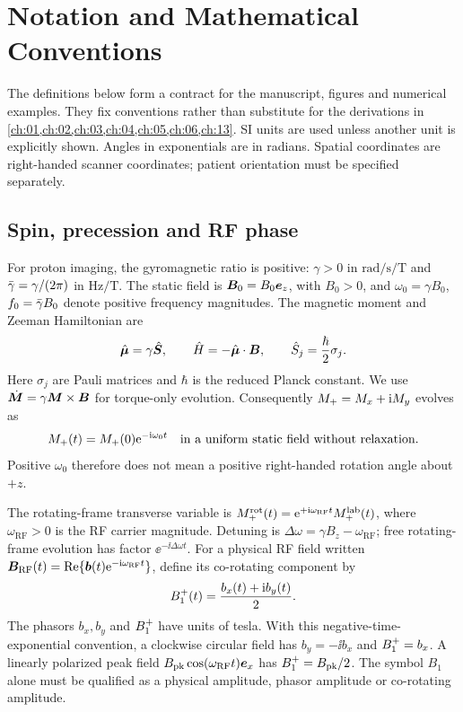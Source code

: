 \chapter{Notation and Mathematical Conventions}
\label{front:conventions}
The definitions below form a contract for the manuscript, figures and
numerical examples. They fix conventions rather than substitute for the
derivations in \cref{ch:01,ch:02,ch:03,ch:04,ch:05,ch:06,ch:13}.
SI units are used unless another unit is explicitly shown. Angles in
exponentials are in radians. Spatial coordinates are right-handed scanner
coordinates; patient orientation must be specified separately.

\section*{Spin, precession and RF phase}
For proton imaging, the gyromagnetic ratio is positive:
$\gamma>0$ in $\si{\radian\per\second\per\tesla}$ and
$\bar{\gamma}=\gamma/(2\pi)$ in $\si{\hertz\per\tesla}$.
The static field is $\bm{B}_0=B_0\bm{e}_z$, with $B_0>0$, and
$\omega_0=\gamma B_0$, $f_0=\bar{\gamma} B_0$ denote positive frequency
magnitudes. The magnetic moment and Zeeman Hamiltonian are
\begin{equation}
 \hat{\bm{\mu}}=\gamma\hat{\bm{S}},\qquad
 \hat{H}=-\hat{\bm{\mu}}\cdot\bm{B},\qquad
 \hat{S}_j=\frac{\hbar}{2}\sigma_j .
 \label{eq:convention:hamiltonian}
\end{equation}
Here $\sigma_j$ are Pauli matrices and $\hbar$ is the reduced Planck constant.
We use $\dot{\bm{M}}=\gamma\bm{M}\times\bm{B}$ for torque-only evolution.
Consequently $M_{+}=M_x+\mathrm{i} M_y$ evolves as
\begin{equation}
 M_{+}(t)=M_{+}(0)\mathrm{e}^{-\mathrm{i}\omega_0t}
 \quad\text{in a uniform static field without relaxation}.
 \label{eq:convention:precession}
\end{equation}
Positive $\omega_0$ therefore does not mean a positive right-handed
rotation angle about $+z$.

The rotating-frame transverse variable is
$M_{+}^{\mathrm{rot}}(t)=\mathrm{e}^{+\mathrm{i}\omega_{\mathrm{RF}}t}
M_{+}^{\mathrm{lab}}(t)$, where $\omega_{\mathrm{RF}}>0$ is the RF carrier
magnitude. Detuning is $\Delta\omega=\gamma B_z-\omega_{\mathrm{RF}}$;
free rotating-frame evolution has factor $\ee^{-\ii\Delta\omega t}$.
For a physical RF field written
$\bm{B}_{\mathrm{RF}}(t)=\operatorname{Re}\{
  \bm{b}(t)\mathrm{e}^{-\mathrm{i}\omega_{\mathrm{RF}}t}\}$,
define its co-rotating component by
\begin{equation}
 B_{1}^{+}(t)=\frac{b_x(t)+\mathrm{i} b_y(t)}{2}.
 \label{eq:convention:b1plus}
\end{equation}
The phasors $b_x,b_y$ and $B_{1}^{+}$ have units of tesla. With this
negative-time-exponential convention, a clockwise circular field has
$b_y=-\ii b_x$ and $B_{1}^{+}=b_x$. A linearly polarized peak field
$B_{\mathrm{pk}}\cos(\omega_{\mathrm{RF}}t)\bm{e}_x$ has
$B_{1}^{+}=B_{\mathrm{pk}}/2$. The symbol $B_1$ alone must be qualified as
a physical amplitude, phasor amplitude or co-rotating amplitude.

